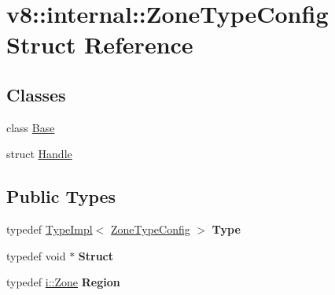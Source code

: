 \hypertarget{structv8_1_1internal_1_1_zone_type_config}{}\section{v8\+:\+:internal\+:\+:Zone\+Type\+Config Struct Reference}
\label{structv8_1_1internal_1_1_zone_type_config}
\subsection*{Classes}
\begin{DoxyCompactItemize}
\item 
class \hyperlink{classv8_1_1internal_1_1_zone_type_config_1_1_base}{Base}
\item 
struct \hyperlink{structv8_1_1internal_1_1_zone_type_config_1_1_handle}{Handle}
\end{DoxyCompactItemize}
\subsection*{Public Types}
\begin{DoxyCompactItemize}
\item 
\hypertarget{structv8_1_1internal_1_1_zone_type_config_a21b1b537c212b65977636100ac8fbfe6}{}typedef \hyperlink{classv8_1_1internal_1_1_type_impl}{Type\+Impl}$<$ \hyperlink{structv8_1_1internal_1_1_zone_type_config}{Zone\+Type\+Config} $>$ {\bfseries Type}\label{structv8_1_1internal_1_1_zone_type_config_a21b1b537c212b65977636100ac8fbfe6}

\item 
\hypertarget{structv8_1_1internal_1_1_zone_type_config_a11f1fccae19adf1e36dbe6a07785fade}{}typedef void $\ast$ {\bfseries Struct}\label{structv8_1_1internal_1_1_zone_type_config_a11f1fccae19adf1e36dbe6a07785fade}

\item 
\hypertarget{structv8_1_1internal_1_1_zone_type_config_a0714e9f8820a10002d2229fa7318e80c}{}typedef \hyperlink{classv8_1_1internal_1_1_zone}{i\+::\+Zone} {\bfseries Region}\label{structv8_1_1internal_1_1_zone_type_config_a0714e9f8820a10002d2229fa7318e80c}

\end{DoxyCompactItemize}
